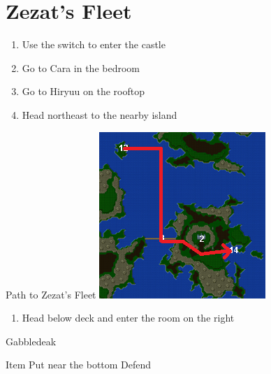 \chapter{Zezat's Fleet}

\vspace{\baselineskip}

\begin{paracol}{2}

\begin{enumerate}
    \item Use the switch to enter the castle
    \item Go to Cara in the bedroom
    \item Go to Hiryuu on the rooftop
    \item Head northeast to the nearby island
\end{enumerate}

\switchcolumn
\begin{misc}{Path to Zezat's Fleet}
    \includegraphics[scale=0.7]{../Graphics/Maps/11. To Zezat's Fleet.png}
\end{misc}

\switchcolumn*
\begin{enumerate}[resume]
    \item Head below deck and enter the room on the right
\end{enumerate}

\begin{boss}{Gabbledeak}
	\varwb
    \begin{notes}
        \item {}
    \end{notes}
	\begin{round}{1}
		\faris Item \then \unequip{\kunai} \then Put near the bottom \then {}
        \galuf Defend
        \bartz \leftCommand{\gilToss}
	\end{round}
	\varwe
\end{boss}


\end{paracol}
